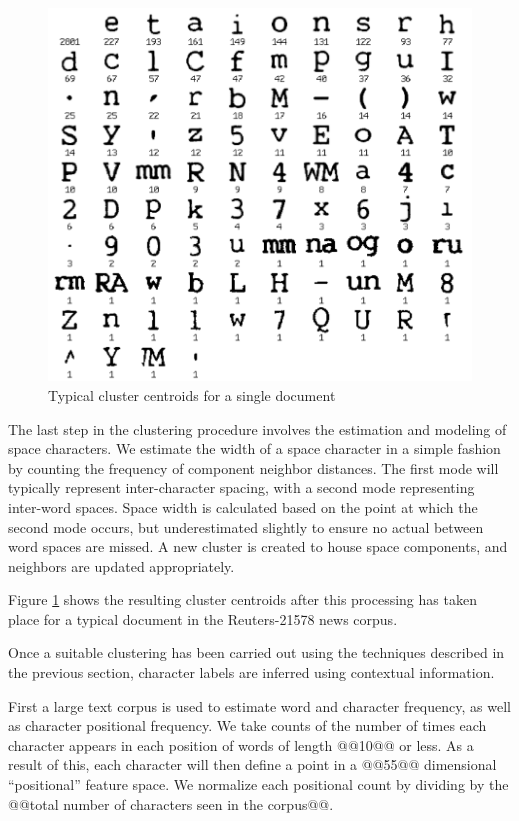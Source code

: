 \documentclass[times, 10pt,twocolumn]{article}
\begin{document}
\begin{figure}[ht]
  \centering
  \includegraphics[scale=.5]{figures/cluster_averages}
  \caption{Typical cluster centroids for a single document}
  \label{clavg_fig}
\end{figure}

The last step in the clustering procedure involves the estimation and modeling
of space characters.  We estimate the width of a space character in a simple
fashion by counting the frequency of component neighbor distances.  The first
mode will typically represent inter-character spacing, with a second mode 
representing inter-word spaces.  Space width is calculated based on the point at
which the second mode occurs, but underestimated slightly to ensure no actual
between word spaces are missed.  A new cluster is created to house space
components, and neighbors are updated appropriately.

Figure \ref{clavg_fig} shows the resulting cluster centroids after this
processing has taken place for a typical document in the Reuters-21578 news
corpus\cite{lewis2004}.



Once a suitable clustering has been carried out using the techniques described
in the previous section, character labels are inferred using contextual
information.

First a large text corpus is used to estimate word and character frequency, as
well as character positional frequency.  We take counts of the number of times
each character appears in each position of words of length @@10@@ or less.
As a result of this, each character will then define a point in a @@55@@
dimensional ``positional'' feature space.  We normalize each positional count by
dividing by the @@total number of characters seen in the corpus@@.
\end{document}
